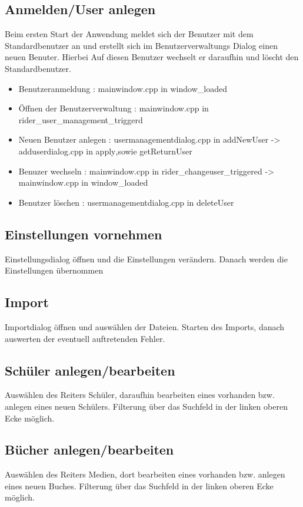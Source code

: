 \subsection{Anmelden/User anlegen}
Beim ersten Start der Anwendung meldet sich der Benutzer mit dem Standardbenutzer an und erstellt sich im Benutzerverwaltungs Dialog einen neuen Benuter. Hierbei  Auf diesen Benutzer wechselt er daraufhin und löscht den Standardbenutzer. 
\begin{itemize}
\item Benutzeranmeldung : mainwindow.cpp in window\_loaded\(\)
\item Öffnen der Benutzerverwaltung : mainwindow.cpp in rider\_user\_management\_triggerd\(\)
\item Neuen Benutzer anlegen : usermanagementdialog.cpp in addNewUser\(\) -> adduserdialog.cpp in apply\(\),sowie getReturnUser\(\) 
\item Benuzer wechseln : mainwindow.cpp in rider\_changeuser\_triggered\(\) -> mainwindow.cpp in window\_loaded\(\)
\item Benutzer löschen : usermanagementdialog.cpp in deleteUser\(\) 
\end{itemize}

\subsection{Einstellungen vornehmen}
Einstellungsdialog öffnen und die Einstellungen verändern. Danach werden die Einstellungen übernommen

\subsection{Import}
Importdialog öffnen und auswählen der Dateien. Starten des Imports, danach auswerten der eventuell auftretenden Fehler.

\subsection{Schüler anlegen/bearbeiten}
Auswählen des Reiters Schüler, daraufhin bearbeiten eines vorhanden bzw. anlegen eines neuen Schülers. Filterung über das Suchfeld in der linken oberen Ecke möglich.

\subsection{Bücher anlegen/bearbeiten}
Auswählen des Reiters Medien, dort bearbeiten eines vorhanden bzw. anlegen eines neuen Buches. Filterung über das Suchfeld in der linken oberen Ecke möglich.


